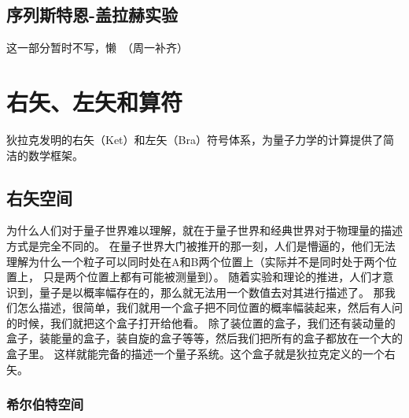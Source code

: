 \documentclass{book}
\begin{document}
\subsection{序列斯特恩-盖拉赫实验}
这一部分暂时不写，懒~（周一补齐）
\section{右矢、左矢和算符}
狄拉克发明的右矢（Ket）和左矢（Bra）符号体系，为量子力学的计算提供了简洁的数学框架。 
\subsection{右矢空间}
为什么人们对于量子世界难以理解，就在于量子世界和经典世界对于物理量的描述方式是完全不同的。
在量子世界大门被推开的那一刻，人们是懵逼的，他们无法理解为什么一个粒子可以同时处在A和B两个位置上（实际并不是同时处于两个位置上，
只是两个位置上都有可能被测量到）。
随着实验和理论的推进，人们才意识到，量子是以概率幅存在的，那么就无法用一个数值去对其进行描述了。
那我们怎么描述，很简单，我们就用一个盒子把不同位置的概率幅装起来，然后有人问的时候，我们就把这个盒子打开给他看。
除了装位置的盒子，我们还有装动量的盒子，装能量的盒子，装自旋的盒子等等，然后我们把所有的盒子都放在一个大的盒子里。
这样就能完备的描述一个量子系统。这个盒子就是狄拉克定义的一个右矢。




\subsubsection{希尔伯特空间}
\end{document}
